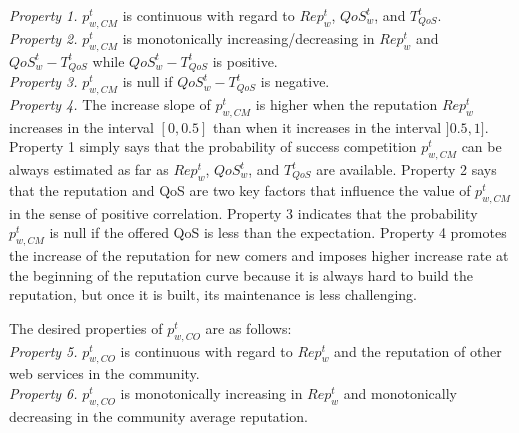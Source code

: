 \documentclass[fleqn]{singlecol-new}
\begin{document}
\noindent\textit{Property 1.}
$p_{w,CM}^t$ is continuous with regard to $Rep^t_w$, $QoS_w^t$,
and $T_{QoS}^t$.
\\

%
\noindent\textit{Property 2.}
$p_{w,CM}^t$  is monotonically increasing/decreasing in $Rep^t_w$
and $QoS_w^t - T_{QoS}^t$ while $QoS_w^t - T_{QoS}^t$ is positive.
\\

%
\noindent\textit{Property 3.}
$p_{w,CM}^t$ is null if $QoS_w^t - T_{QoS}^t$ is negative.
\\

%
%
\noindent\textit{Property 4.}
The increase slope of $p_{w,CM}^t$ is higher when the reputation
$Rep^t_w$ increases in the interval $[0, 0.5]$ than when it
increases in the interval $]0.5, 1]$.
\\

\noindent Property 1 simply says that the probability of success
competition $p_{w,CM}^t$ can be always estimated as far as
$Rep^t_w$, $QoS_w^t$, and $T_{QoS}^t$ are available. Property 2
says that the reputation and QoS are two key factors that
influence the value of $p_{w,CM}^t$ in the sense of positive
correlation. Property 3 indicates that the probability
$p_{w,CM}^t$ is null if the offered QoS is less than the
expectation. Property 4 promotes the increase of the reputation
for new comers and imposes higher increase rate at the beginning
of the reputation curve because it is always hard to build the
reputation, but once it is built, its maintenance is less
challenging.


\noindent The desired properties of $p_{w,CO}^t$ are as follows:
\\

\noindent\textit{Property 5.}
$p_{w,CO}^t$ is continuous with regard to $Rep^t_w$ and the
reputation of other web services in the community.
\\

%
\noindent\textit{Property 6.}
$p_{w,CO}^t$  is monotonically increasing in $Rep^t_w$ and
 monotonically decreasing in the community average reputation.
\\

%
%
%
\end{document}
